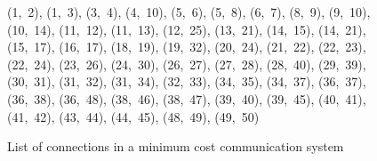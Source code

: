 \begin{figure}[H]
	\centering
	\begin{multicols}{5}
(1,~2), (1,~3), (3,~4), (4,~10), (5,~6), (5,~8), (6,~7), (8,~9), (9,~10), (10,~14), (11,~12), (11,~13), (12,~25), (13,~21), (14,~15), (14,~21), (15,~17), (16,~17), (18,~19), (19,~32), (20,~24), (21,~22), (22,~23), (22,~24), (23,~26), (24,~30), (26,~27), (27,~28), (28,~40), (29,~39), (30,~31), (31,~32), (31,~34), (32,~33), (34,~35), (34,~37), (36,~37), (36,~38), (36,~48), (38,~46), (38,~47), (39,~40), (39,~45), (40,~41), (41,~42), (43,~44), (44,~45), (48,~49), (49,~50)
	\end{multicols}
	\caption{List of connections in a minimum cost communication system}
	\label{mst1}
\end{figure}